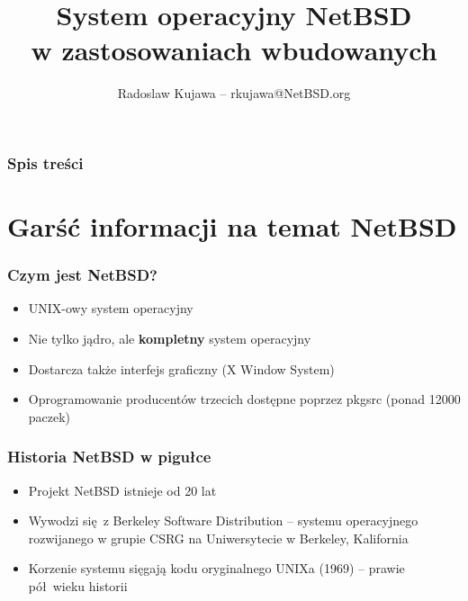 \documentclass[dvipsnames,table]{beamer}
\title{System operacyjny NetBSD\\ w zastosowaniach wbudowanych}
\author{Radoslaw Kujawa -- rkujawa@NetBSD.org}
\institute{The NetBSD Foundation / OSEC}
\begin{document}
\begin{frame}
\titlepage
\end{frame}

\begin{frame}[allowframebreaks]
\frametitle{Spis treści}
{
\hypersetup{colorlinks=true,linkcolor=black,urlcolor=NetBSD-orange}
\tableofcontents
}
\end{frame}

\section{Garść informacji na temat NetBSD}

\begin{frame}
\frametitle{Czym jest NetBSD?}
\begin{itemize}
	\item UNIX-owy system operacyjny
	\item Nie tylko jądro, ale \textbf{kompletny} system operacyjny
	\item Dostarcza także interfejs graficzny (X Window System)
	\item Oprogramowanie producentów trzecich dostępne poprzez pkgsrc (ponad 12000 paczek)
\end{itemize}
\end{frame}

\begin{frame}
\frametitle{Historia NetBSD w pigułce}
\begin{itemize}
	\item Projekt NetBSD istnieje od 20 lat
	\item Wywodzi się z Berkeley Software Distribution -- systemu operacyjnego rozwijanego w grupie CSRG na Uniwersytecie w Berkeley, Kalifornia
	\item Korzenie systemu sięgają kodu oryginalnego UNIXa (1969) -- prawie pół wieku historii
\end{itemize}
\end{frame}
\end{document}
